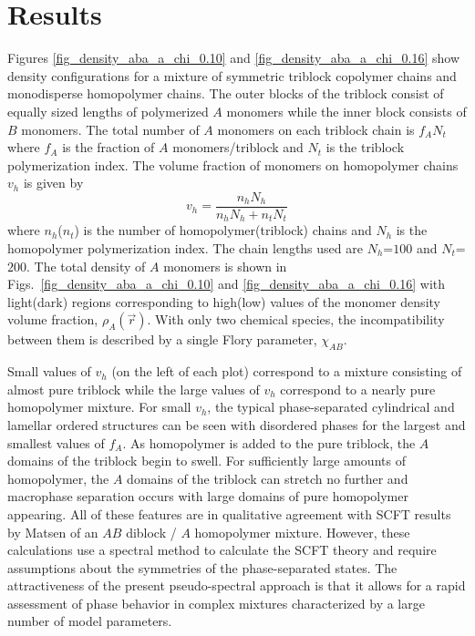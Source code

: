 \documentclass[onecolumn,amsmath,amssymb,floatfix]{elsart}
\begin{document}
\section{Results}
\label{sec_results}


Figures \ref{fig_density_aba_a_chi_0.10} and
\ref{fig_density_aba_a_chi_0.16} show density configurations for a
mixture of symmetric triblock copolymer chains and monodisperse
homopolymer chains.
The outer blocks of the triblock consist of
equally sized lengths of polymerized $A$ monomers while the inner
block consists of $B$ monomers.
The total number of $A$ monomers
on each triblock chain is $f_A N_t$ where $f_A$ is the fraction of
$A$ monomers/triblock and $N_t$ is the triblock polymerization
index.
The volume fraction of monomers on homopolymer chains $v_h$ is given by
%
 \begin{equation}
 \label{eqn_vol_frac_homopolymer}
   v_h = \frac{n_h N_h}{n_h N_h + n_t N_t}
 \end{equation}
%
where $n_h$($n_t$) is the number of homopolymer(triblock) chains
and $N_h$ is the homopolymer polymerization index.
The chain lengths used are $N_h$=$100$ and $N_t$=$200$.
The total density of $A$ monomers is shown in Figs.~\ref{fig_density_aba_a_chi_0.10} and
\ref{fig_density_aba_a_chi_0.16}
with light(dark) regions corresponding to high(low) values of the
monomer density volume fraction, $\rho_A({\vec r})$.
With only two chemical species, the incompatibility between them
is described by a single Flory parameter, $\chi_{AB}$.


Small values of $v_h$ (on the left of each plot) correspond to a
mixture consisting of almost pure triblock while the large values
of $v_h$ correspond to a nearly pure homopolymer mixture.
For small $v_h$, the typical phase-separated cylindrical and lamellar
ordered structures can be seen with disordered phases for the
largest and smallest values of $f_A$.
As homopolymer is added to
the pure triblock, the $A$ domains of the triblock begin to swell.
For sufficiently large amounts of homopolymer, the $A$ domains of
the triblock can stretch no further and macrophase separation
occurs with large domains of pure homopolymer appearing.
All of these features are in qualitative agreement with SCFT results by
Matsen \cite{matsen_mixtures95} of an $AB$ diblock / $A$
homopolymer mixture.
However, these calculations use a spectral
method to calculate the SCFT theory and require assumptions about
the symmetries of the phase-separated states.
The attractiveness of the present pseudo-spectral approach is that
it allows for a rapid assessment of phase behavior in complex
mixtures characterized by a large number of model parameters.
\end{document}
